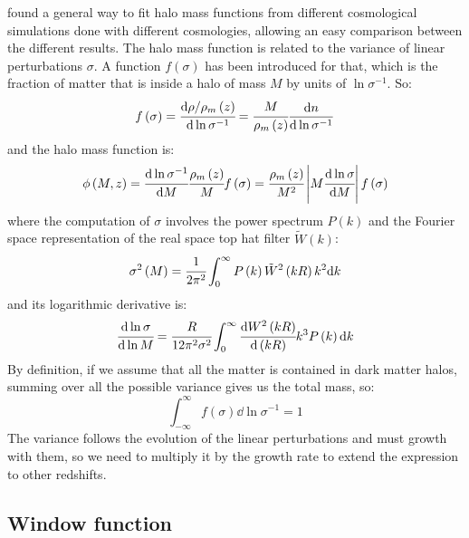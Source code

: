 \citet{Jenkins+01} found a general way to fit halo mass functions from
different cosmological simulations done with different cosmologies, allowing an
easy comparison between the different results. The halo mass function is
related to the variance of linear perturbations $\sigma$. A function
$f\left(\sigma\right)$ has been introduced for that, which is the fraction of
matter that is inside a halo of mass $M$ by units of $\ln\sigma^{-1}$. So:
%
\begin{equation}
    f\left(\sigma\right)=
        \cfrac{{\rm{d}}\rho/\rho_m\left(z\right)}{{\rm{d}}\ln\sigma^{-1}}=
        \cfrac{M}{\rho_m\left(z\right)}\frac{{\rm{d}} n}{{\rm{d}}\ln\sigma^{-1}}
\end{equation}
%
and the halo mass function is:
%
\begin{equation}
    \phi\left(M,z\right)=\cfrac{{\rm{d}}\ln\sigma^{-1}}{{\rm{d}} M}
    \cfrac{\rho_m\left({z}\right)}{M}f\left(\sigma\right)=
    \cfrac{\rho_m\left(z\right)}{M^2}\left|M\cfrac{{\rm{d}}\ln\sigma}{{\rm{d}} M}\right|
    f\left(\sigma\right)
\end{equation}
%
where the computation of $\sigma$ involves the power spectrum $P\left(k\right)$
and the Fourier space representation of the real space top hat filter
$\tilde{W}\left(k\right)$:
%
\begin{equation}
    \sigma^2\left(M\right) =
    \cfrac{1}{2\pi^2}\int_0^\infty P\left(k\right)
    \tilde{W}^2\left(k R\right) k^2{\rm{d}} k
\end{equation}
%
and its logarithmic derivative is:
%
\begin{equation}
    \cfrac{{\rm{d}} \ln\sigma}{{\rm{d}}\ln M} = \cfrac{R}{12\pi^2\sigma^2}
    \int_0^\infty \cfrac{{\rm{d}} W^2 \left(kR\right)}{{\rm{d}} \left(kR\right)} k^3
    P \left(k\right) {\rm{d}} k
\end{equation}
%
By definition, if we assume that all the matter is contained in dark matter
halos, summing over all the possible variance gives us the total mass, so:
%
\begin{equation}
    \int_{-\infty}^\infty f\left(\sigma\right)\dd\ln\sigma^{-1}=1
\end{equation}
%
The variance follows the evolution of the linear perturbations and must
growth with them, so we need to multiply it by the growth rate to extend the
expression to other redshifts.

\subsection{Window function}
\label{sub:window_function}

